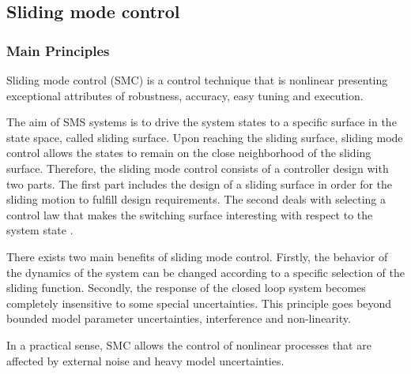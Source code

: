\documentclass{thesisreport}
\begin{document}





 \subsection{Sliding mode control}
 
 
 
  \subsubsection{Main Principles}
 
 
 
Sliding mode control (SMC) is a control technique that is nonlinear presenting exceptional attributes of robustness,
accuracy, easy tuning and execution.
 
The aim of SMS systems is to drive the system states to a specific surface in the state space, called sliding surface. Upon
reaching the sliding surface, sliding mode control allows the states to remain on the close neighborhood of the sliding
surface. Therefore, the sliding mode control consists of a controller design with two parts. The first part includes the
design of a sliding surface in order for the sliding motion to fulfill design requirements. The second deals with selecting a
control law that makes the switching surface interesting with respect to the system state \cite{Utkin1997}.




There exists two main benefits of sliding mode control. Firstly, the behavior of the dynamics of the system can be changed
according to a specific selection of the sliding function. Secondly, the response of the closed loop system becomes completely
insensitive to some special uncertainties. This principle goes beyond bounded model parameter uncertainties, interference and non-linearity.

In a practical sense, SMC allows the control of nonlinear processes that are affected by external noise and heavy model uncertainties.
\end{document}
